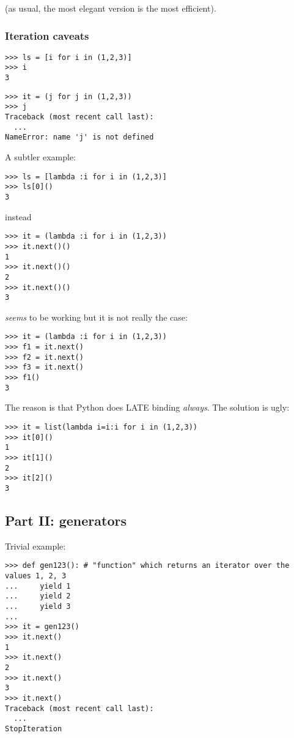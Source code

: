 \documentclass[10pt,a4paper,english]{article}
\begin{document}
(as usual, the most elegant version is the most efficient).



\hypertarget{iteration-caveats}{}
\subsubsection*{Iteration caveats}
\begin{verbatim}>>> ls = [i for i in (1,2,3)]
>>> i 
3\end{verbatim}
\begin{verbatim}>>> it = (j for j in (1,2,3))
>>> j 
Traceback (most recent call last):
  ...
NameError: name 'j' is not defined\end{verbatim}

A subtler example:
\begin{verbatim}>>> ls = [lambda :i for i in (1,2,3)]
>>> ls[0]()
3\end{verbatim}

instead
\begin{verbatim}>>> it = (lambda :i for i in (1,2,3))
>>> it.next()()
1
>>> it.next()()
2
>>> it.next()()
3\end{verbatim}

\emph{seems} to be working but it is not really the case:
\begin{verbatim}>>> it = (lambda :i for i in (1,2,3))
>>> f1 = it.next()
>>> f2 = it.next()
>>> f3 = it.next()
>>> f1()
3\end{verbatim}

The reason is that Python does LATE binding \emph{always}. The solution is ugly:
\begin{verbatim}>>> it = list(lambda i=i:i for i in (1,2,3))
>>> it[0]()
1
>>> it[1]()
2
>>> it[2]()
3\end{verbatim}



\hypertarget{part-ii-generators}{}
\subsection*{Part II: generators}

Trivial example:
\begin{verbatim}>>> def gen123(): # "function" which returns an iterator over the values 1, 2, 3
...     yield 1
...     yield 2
...     yield 3
...
>>> it = gen123()
>>> it.next()
1
>>> it.next()
2
>>> it.next()
3
>>> it.next()
Traceback (most recent call last):
  ...
StopIteration\end{verbatim}
\end{document}
